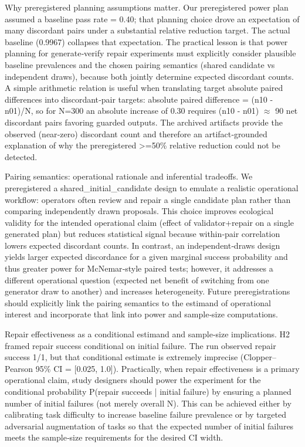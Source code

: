 \documentclass[conference]{IEEEtran}
\begin{document}
Why preregistered planning assumptions matter. Our preregistered power plan assumed a baseline pass rate = 0.40; that planning choice drove an expectation of many discordant pairs under a substantial relative reduction target. The actual baseline (0.9967) collapses that expectation. The practical lesson is that power planning for generate‑verify repair experiments must explicitly consider plausible baseline prevalences and the chosen pairing semantics (shared candidate vs independent draws), because both jointly determine expected discordant counts. A simple arithmetic relation is useful when translating target absolute paired differences into discordant‑pair targets: absolute paired difference = (n10 - n01)/N, so for N=300 an absolute increase of 0.30 requires (n10 - n01) \ensuremath{\approx} 90 net discordant pairs favoring guarded outputs. The archived artifacts provide the observed (near‑zero) discordant count and therefore an artifact‑grounded explanation of why the preregistered >=50\% relative reduction could not be detected.

Pairing semantics: operational rationale and inferential tradeoffs. We preregistered a shared\_initial\_candidate design to emulate a realistic operational workflow: operators often review and repair a single candidate plan rather than comparing independently drawn proposals. This choice improves ecological validity for the intended operational claim (effect of validator+repair on a single generated plan) but reduces statistical signal because within‑pair correlation lowers expected discordant counts. In contrast, an independent‑draws design yields larger expected discordance for a given marginal success probability and thus greater power for McNemar‑style paired tests; however, it addresses a different operational question (expected net benefit of switching from one generator draw to another) and increases heterogeneity. Future preregistrations should explicitly link the pairing semantics to the estimand of operational interest and incorporate that link into power and sample‑size computations.

Repair effectiveness as a conditional estimand and sample‑size implications. H2 framed repair success conditional on initial failure. The run observed repair success 1/1, but that conditional estimate is extremely imprecise (Clopper--Pearson 95\% CI = [0.025, 1.0]). Practically, when repair effectiveness is a primary operational claim, study designers should power the experiment for the conditional probability P(repair succeeds | initial failure) by ensuring a planned number of initial failures (not merely overall N). This can be achieved either by calibrating task difficulty to increase baseline failure prevalence or by targeted adversarial augmentation of tasks so that the expected number of initial failures meets the sample‑size requirements for the desired CI width.
\end{document}

